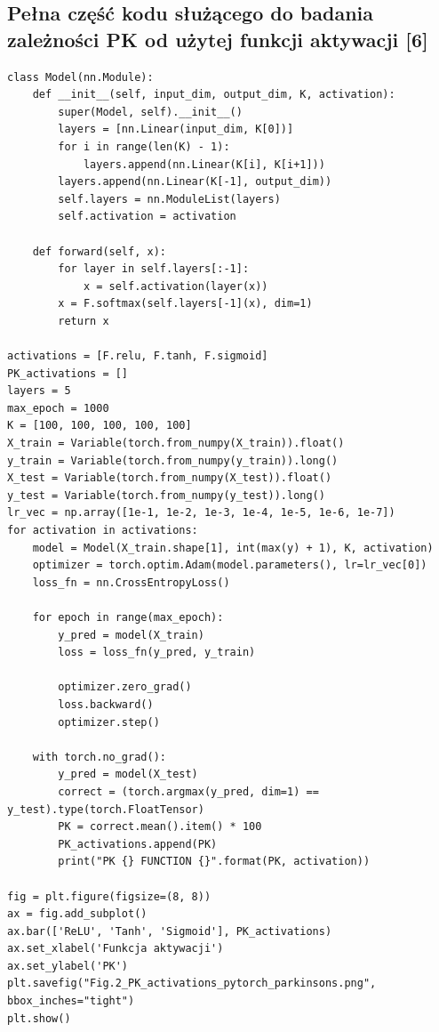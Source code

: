 \documentclass[a4paper]{article}
\begin{document}
\subsection{Pełna część kodu służącego do badania zależności PK od użytej funkcji aktywacji [6]}
\begin{verbatim}
class Model(nn.Module):
    def __init__(self, input_dim, output_dim, K, activation):
        super(Model, self).__init__()
        layers = [nn.Linear(input_dim, K[0])]
        for i in range(len(K) - 1):
            layers.append(nn.Linear(K[i], K[i+1]))
        layers.append(nn.Linear(K[-1], output_dim))
        self.layers = nn.ModuleList(layers)
        self.activation = activation

    def forward(self, x):
        for layer in self.layers[:-1]:
            x = self.activation(layer(x))
        x = F.softmax(self.layers[-1](x), dim=1)
        return x

activations = [F.relu, F.tanh, F.sigmoid]
PK_activations = []
layers = 5
max_epoch = 1000
K = [100, 100, 100, 100, 100]
X_train = Variable(torch.from_numpy(X_train)).float()
y_train = Variable(torch.from_numpy(y_train)).long()
X_test = Variable(torch.from_numpy(X_test)).float()
y_test = Variable(torch.from_numpy(y_test)).long()
lr_vec = np.array([1e-1, 1e-2, 1e-3, 1e-4, 1e-5, 1e-6, 1e-7])
for activation in activations:
    model = Model(X_train.shape[1], int(max(y) + 1), K, activation)
    optimizer = torch.optim.Adam(model.parameters(), lr=lr_vec[0])
    loss_fn = nn.CrossEntropyLoss()

    for epoch in range(max_epoch):
        y_pred = model(X_train)
        loss = loss_fn(y_pred, y_train)

        optimizer.zero_grad()
        loss.backward()
        optimizer.step()

    with torch.no_grad():
        y_pred = model(X_test)
        correct = (torch.argmax(y_pred, dim=1) == y_test).type(torch.FloatTensor)
        PK = correct.mean().item() * 100
        PK_activations.append(PK)
        print("PK {} FUNCTION {}".format(PK, activation))

fig = plt.figure(figsize=(8, 8))
ax = fig.add_subplot()
ax.bar(['ReLU', 'Tanh', 'Sigmoid'], PK_activations)
ax.set_xlabel('Funkcja aktywacji')
ax.set_ylabel('PK')
plt.savefig("Fig.2_PK_activations_pytorch_parkinsons.png", bbox_inches="tight")
plt.show()
\end{verbatim}
\end{document}
